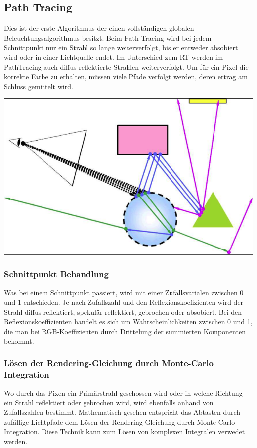 \documentclass[10pt]{article}
\begin{document}
\subsection{Path Tracing}
Dies ist der erste Algorithmus der einen vollständigen globalen Beleuchtungsalgorithmus besitzt. Beim Path Tracing wird bei jedem Schnittpunkt nur ein Strahl so lange weiterverfolgt, bis er entweder absobiert wird oder in einer Lichtquelle endet. Im Unterschied zum RT werden im PathTracing auch diffus reflektierte Strahlen weiterverfolgt. Um für ein Pixel die korrekte Farbe zu erhalten, müssen viele Pfade verfolgt werden, deren ertrag am Schluss gemittelt wird.
\begin{center}
	\includegraphics[scale=0.4]{pathtracing.png}
\end{center}
\subsubsection{Schnittpunkt Behandlung}
Was bei einem Schnittpunkt passiert, wird mit einer Zufallsvarialen zwischen 0 und 1 entschieden. Je nach Zufallszahl und den Reflexionskoefizienten wird der Strahl diffus reflektiert, spekulär reflektiert, gebrochen oder absobiert. Bei den Reflexionskoeffizienten handelt es sich um Wahrscheinlichkeiten zwischen 0 und 1, die man bei RGB-Koeffizienten durch Drittelung der summierten Komponenten bekommt.
\subsubsection{Lösen der Rendering-Gleichung durch Monte-Carlo Integration}
Wo durch das Pixen ein Primärstrahl geschossen wird oder in welche Richtung ein Strahl reflektiert oder gebrochen wird, wird ebenfalls anhand von Zufallszahlen bestimmt. Mathematisch gesehen entspricht das Abtasten durch zufällige Lichtpfade dem Lösen der Rendering-Gleichung durch Monte Carlo Integration. Diese Technik kann zum Lösen von komplexen Integralen verwedet werden.
\end{document}
